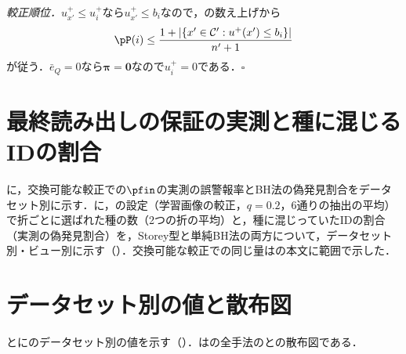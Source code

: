 \textit{較正順位．}$u^{+}_{x'}\le u^{+}_i$なら$u^{+}_{x'}\le b_i$なので，の数え上げから
\begin{equation*}
\pP(i)\le\frac{1+|\{x'\in\mathcal{C}':u^{+}(x')\le b_i\}|}{n'+1}
\end{equation*}
が従う．$\bar e_Q=0$なら$\boldsymbol{\pi}=\mathbf{0}$なので$u^{+}_i=0$である．$\square$

\section{最終読み出しの保証の実測と種に混じるIDの割合}
\label{sec:app_fdp}


に，交換可能な較正での$\pfin$の実測の誤警報率とBH法の偽発見割合をデータセット別に示す．に，の設定（学習画像の較正，$q{=}0.2$，6通りの抽出の平均）で折ごとに選ばれた種の数（2つの折の平均）と，種に混じっていたIDの割合（実測の偽発見割合）を，Storey型と単純BH法の両方について，データセット別・ビュー別に示す（）．交換可能な較正での同じ量はの本文に範囲で示した．

\begin{table}[htbp]
\centering
\caption{最終スコア$\pfin$の保証の実測（交換可能な較正：IDの検証画像からクラスあたり4枚を較正画像とし，\NVcalNSplits{}通りの抽出の平均，単体）．IDの誤警報率は$\pfin\le\alpha$と判定されたIDのテスト画像の割合（命題4(i)：$\le\alpha$），偽発見割合はBH法（$q{=}0.2$）で棄却された画像のうちIDの割合（命題4(ii)：期待値$\le0.2$），再現率は未知のうち棄却された割合．}
\label{tab:val}
\vspace{1.5mm}

\end{table}

\begin{table}[htbp]
\centering
\caption{学習画像の較正で選ばれた種（折あたり，6通りの抽出の平均）．種は種の数，ID率は種に混じっていたIDの割合（実測の偽発見割合，水準$q{=}0.2$）．}
\label{tab:fdp}
\vspace{1.5mm}

\end{table}

\section{データセット別の値と散布図}
\label{sec:app_four}
とにのデータセット別の値を示す（）．はの全手法の\AUC{}と\FPR{}の散布図である．

